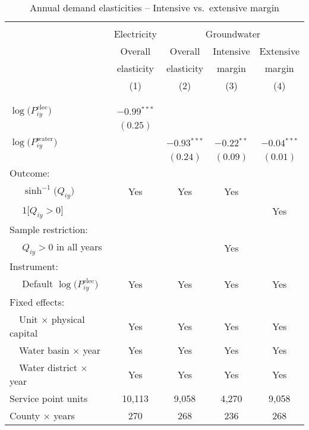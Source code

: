 \begin{table}[t!]\centering
\small
\caption{Annual demand elasticities -- Intensive vs.\ extensive margin \label{tab:elec_water_intens_extens}}
\vspace{-0.1cm}
\small
\begin{adjustbox}{center} 
\begin{tabular}{lcccc} 
\hline \hline
\vspace{-0.37cm}
\\
 & Electricity & \multicolumn{3}{c}{Groundwater} \\
 \cmidrule(r){2-2} \cmidrule(l){3-5}
 & Overall   & Overall & Intensive & Extensive \\
 & elasticity   & elasticity & margin & margin \\
[0.1em]
 & (1)   & (2)  & (3)  & (4) \\ 
\vspace{-0.37cm}
\\
\cline{2-5}
\vspace{-0.27cm}
\\
 $\log\big(P^{\text{elec}}_{iy}\big)$ ~ & $-0.99$$^{***}$  &  &  &  \\ 
& $(0.25)$ &  &  &  \\
[0.1em] 
 $\log\big(P^{\text{water}}_{iy}\big)$ ~ &  & $-0.93$$^{***}$ & $-0.22$$^{**}$  & $-0.04$$^{***}$ \\ 
&   & $(0.24)$ & $(0.09)$ & $(0.01)$ \\
[1.5em] 
Outcome: \\
~~ $\sinh^{-1}\big(Q_{iy}\big)$ & Yes& Yes & Yes & \\
[0.1em] 
~~ $1\big[Q_{iy}>0\big]$ & & & & Yes \\
[1.5em] 
Sample restriction: \\
~~ $Q_{iy} > 0$ in all years & & & Yes & \\
[1.5em] 
Instrument: \\
[0.1em] 
~~ Default $\log\big(P^{\text{elec}}_{iy}\big)$  & Yes   & Yes  & Yes & Yes \\
[1.5em] 
Fixed effects: \\
[0.1em] 
~~Unit $\times$ physical capital & Yes & Yes & Yes & Yes  \\
[0.1em] 
~~Water basin $\times$ year & Yes & Yes & Yes & Yes \\
[0.1em] 
~~Water district $\times$ year &  Yes & Yes & Yes & Yes \\
[1.5em] 
Service point units & 10,113  & 9,058 & 4,270 & 9,058  \\ 
[0.1em] 
County $\times$ years  & 270 & 268 & 236 & 268 \\ 

\end{tabular}
\end{adjustbox}
\end{table}
